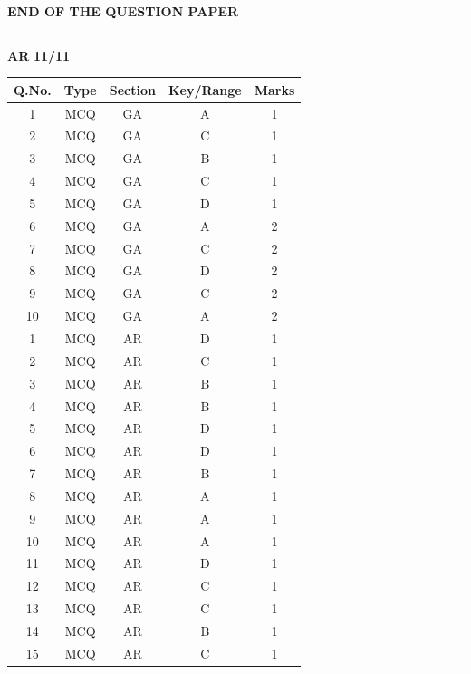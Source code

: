 \documentclass[journal,12pt,onecolumn]{IEEEtran}
\theoremstyle{remark}
\begin{document}
\vspace{1cm}

\begin{center}
\textbf{END OF THE QUESTION PAPER}
\end{center}

\vspace{5.5cm}
 \noindent
\hrule \vspace{0.0875CM} \textbf{AR} \hfill  \textbf{11/11}

\newpage



\vspace{0.5cm}

\renewcommand{\arraystretch}{2.2} %
\setlength{\tabcolsep}{20pt} %
\hspace{1.5cm}
\begin{tabular}{|c|c|c|c|c|}
\hline
\rowcolor{orange!30} %
\textbf{Q.No.} & \textbf{Type} & \textbf{Section} & \textbf{Key/Range} & \textbf{Marks} \\
\hline
1  & MCQ & GA & A & 1 \\ \hline
2  & MCQ & GA & C & 1 \\ \hline
3  & MCQ & GA & B & 1 \\ \hline
4  & MCQ & GA & C & 1 \\ \hline
5  & MCQ & GA & D & 1 \\ \hline
6  & MCQ & GA & A & 2 \\ \hline
7  & MCQ & GA & C & 2 \\ \hline
8  & MCQ & GA & D & 2 \\ \hline
9  & MCQ & GA & C & 2 \\ \hline
10 & MCQ & GA & A & 2 \\ \hline
1  & MCQ & AR & D & 1 \\ \hline
2  & MCQ & AR & C & 1 \\ \hline
3  & MCQ & AR & B & 1 \\ \hline
4  & MCQ & AR & B & 1 \\ \hline
5  & MCQ & AR & D & 1 \\ \hline
6  & MCQ & AR & D & 1 \\ \hline
7  & MCQ & AR & B & 1 \\ \hline
8  & MCQ & AR & A & 1 \\ \hline
9  & MCQ & AR & A & 1 \\ \hline
10 & MCQ & AR & A & 1 \\ \hline
11 & MCQ & AR & D & 1 \\ \hline
12 & MCQ & AR & C & 1 \\ \hline
13 & MCQ & AR & C & 1 \\ \hline
14 & MCQ & AR & B & 1 \\ \hline
15 & MCQ & AR & C & 1 \\ \hline
\end{tabular}
\vspace{1.5cm}
\end{document}

